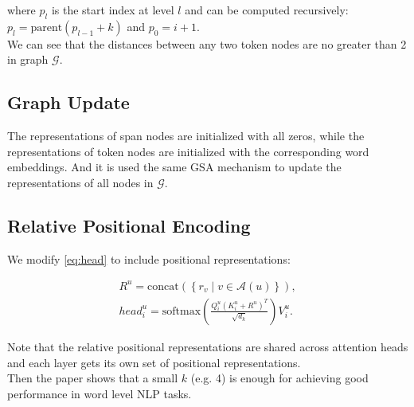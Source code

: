 where $p_l$ is the start index at level $l$ and can be computed recursively:
$p_l = \text{parent}(p_{l-1} + k)$ and $p_0 = i + 1$.\\
We can see that the distances between any two token nodes are no greater than 2
in graph $\mathcal{G}$.

\subsection{Graph Update}

The representations of span nodes are initialized with all zeros, while the
representations of token nodes are initialized with the corresponding word
embeddings. And it is used the same GSA mechanism to update the representations
of all nodes in $\mathcal{G}$.

\subsection{Relative Positional Encoding}

We modify \autoref{eq:head} to include positional representations:

\begin{align*}
    R^u = \text{concat} \left( \left\{ r_v \mid v \in \mathcal{A}(u) \right\}
    \right),\\
    head_i^u = \text{softmax} \left( \frac{Q_i^u (K_i^u + R^u)^T }{\sqrt{d_k}}
    \right) V_i^u.
\end{align*}

Note that the relative positional representations are shared across attention
heads and each layer gets its own set of positional representations.\\
Then the paper shows that a small $k$ (e.g. 4) is enough for achieving good
performance in word level NLP tasks.
